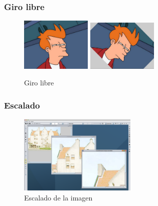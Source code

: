 \subsubsection{Giro libre}
\vskip0.3cm
\begin{figure}[H]
 \centering
  \includegraphics[width=0.3\textwidth]{imagenes/Fry.jpg}
  \includegraphics[width=0.3\textwidth]{imagenes/fryGiro.jpg}
 \caption{Giro libre}
 \label{diseño}
\end{figure}
\subsubsection{Escalado}
\vskip0.3cm
\begin{figure}[H]
 \centering
  \includegraphics[width=0.5\textwidth]{imagenes/escalado.png}
 \caption{Escalado de la imagen}
 \label{diseño}
\end{figure}
